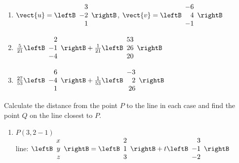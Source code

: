 \begin{multicols}{2}
\begin{ex}
\begin{enumerate}[label={\alph*.}]
\item $\vect{u} = \leftB
\begin{array}{r}
3\\
-2\\
1
\end{array}
\rightB$, 
$\vect{v} = \leftB
\begin{array}{r}
-6\\
4\\
-1
\end{array}
\rightB
$

\end{enumerate}
\begin{sol}
\begin{enumerate}[label={\alph*.}]
\setcounter{enumi}{1}
\item  $\frac{5}{21}\leftB
\begin{array}{r}
2\\
-1\\
-4
\end{array}
\rightB
+
\frac{1}{21}\leftB
\begin{array}{r}
53\\
26\\
20
\end{array}
\rightB$

\setcounter{enumi}{3}
\item  
$\frac{27}{53}\leftB
\begin{array}{r}
6\\
-4\\
1
\end{array}
\rightB
+
\frac{1}{53}\leftB
\begin{array}{r}
-3\\
2\\
26
\end{array}
\rightB$


\end{enumerate}
\end{sol}
\end{ex}

\begin{ex}
Calculate the distance from the point $P$ to the line in each case and find the point $Q$ on the line closest to $P$.


\begin{enumerate}[label={\alph*.}]
\item $P(3,2-1) \quad $ \\ line:  $\leftB
\begin{array}{r}
x\\
y\\
z
\end{array}
\rightB
=
\leftB
\begin{array}{r}
2\\
1\\
3
\end{array}
\rightB
+t
\leftB
\begin{array}{r}
3\\
-1\\
-2
\end{array}
\rightB
$


\end{enumerate}
\end{ex}
\end{multicols}
